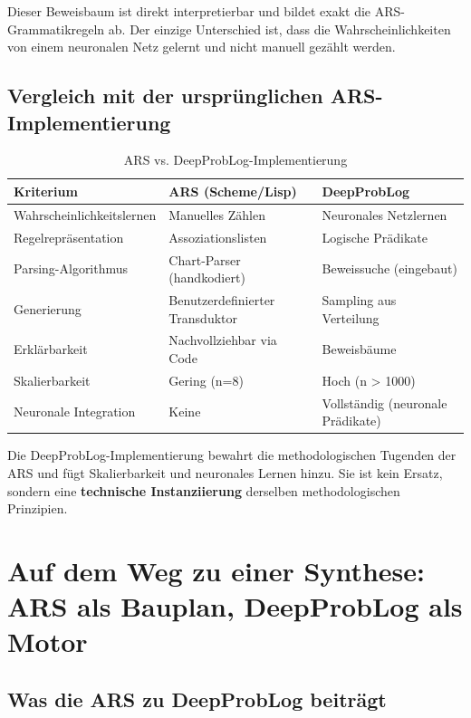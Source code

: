 \documentclass[12pt,a4paper]{article}
\begin{document}
Dieser Beweisbaum ist direkt interpretierbar und bildet exakt die ARS-Grammatikregeln 
ab. Der einzige Unterschied ist, dass die Wahrscheinlichkeiten von einem 
neuronalen Netz gelernt und nicht manuell gezählt werden.

\subsection{Vergleich mit der ursprünglichen ARS-Implementierung}

\begin{table}[H]
\centering
\caption{ARS vs. DeepProbLog-Implementierung}
\label{tab:comparison}
\begin{tabular}{@{} p{4cm} p{4cm} p{4cm} @{}}
\toprule
\textbf{Kriterium} & \textbf{ARS (Scheme/Lisp)} & \textbf{DeepProbLog} \\
\midrule
Wahrscheinlichkeitslernen & Manuelles Zählen & Neuronales Netzlernen \\
Regelrepräsentation & Assoziationslisten & Logische Prädikate \\
Parsing-Algorithmus & Chart-Parser (handkodiert) & Beweissuche (eingebaut) \\
Generierung & Benutzerdefinierter Transduktor & Sampling aus Verteilung \\
Erklärbarkeit & Nachvollziehbar via Code & Beweisbäume \\
Skalierbarkeit & Gering (n=8) & Hoch (n > 1000) \\
Neuronale Integration & Keine & Vollständig (neuronale Prädikate) \\
\bottomrule
\end{tabular}
\end{table}

Die DeepProbLog-Implementierung bewahrt die methodologischen Tugenden der ARS 
und fügt Skalierbarkeit und neuronales Lernen hinzu. Sie ist kein Ersatz, 
sondern eine \textbf{technische Instanziierung} derselben methodologischen 
Prinzipien.

\section{Auf dem Weg zu einer Synthese: ARS als Bauplan, DeepProbLog als Motor}

\subsection{Was die ARS zu DeepProbLog beiträgt}
\end{document}

